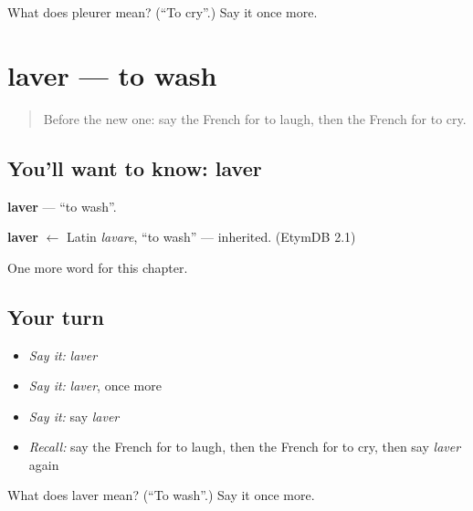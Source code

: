 \begin{tcolorbox}[breakable,colback=teal!4,colframe=teal!35!black,title={Before you move on}]
What does pleurer mean? (\textquotedblleft{}To cry\textquotedblright{}.) Say it once more.
\end{tcolorbox}
\section[laver]{laver — to wash}

\label{lesson:FR-C60-laver}



\begin{quote}
Before the new one: say the French for to laugh, then the French for to cry.
\end{quote}

\subsection*{You'll want to know: laver}
\textbf{laver} — \textquotedblleft{}to wash\textquotedblright{}.

\begin{cousinweb}
\textbf{laver} $\leftarrow$ Latin \emph{lavare}, \textquotedblleft{}to wash\textquotedblright{} — inherited. (EtymDB 2.1)
\end{cousinweb}

\begin{grammarlens}[title={What you've built}]
One more word for this chapter.
\end{grammarlens}

\subsection*{Your turn}
\begin{itemize}
\raggedright
  \item \emph{Say it:} \emph{laver}
  \item \emph{Say it:} \emph{laver}, once more
  \item \emph{Say it:} say \emph{laver}
  \item \emph{Recall:} say the French for to laugh, then the French for to cry, then say \emph{laver} again
\end{itemize}

\begin{tcolorbox}[breakable,colback=teal!4,colframe=teal!35!black,title={Before you move on}]
What does laver mean? (\textquotedblleft{}To wash\textquotedblright{}.) Say it once more.
\end{tcolorbox}
